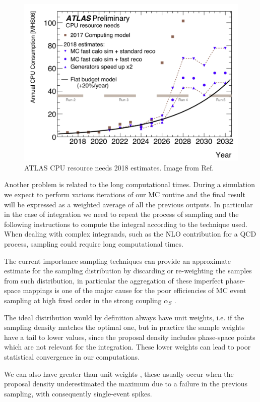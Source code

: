 \documentclass[../main/main.tex]{subfiles}
\begin{document}
\begin{figure}[h]
	\centering
	\includegraphics[width = 12cm]{../images/CPU-cost.png}
	\caption{ATLAS CPU resource needs 2018 estimates. Image from Ref\cite{ATL-SOFT-PUB-2021-001}.}
	\label{CPU cost}
\end{figure}

Another problem is related to the long computational times.
During a simulation we expect to perform various iterations of our MC routine and the final result 
will be expressed as a weighted average of all the previous outputs.
In particular in the case of integration we need to repeat the process of sampling and the following instructions to compute the integral according to the technique used. When dealing with complex integrands, such as the NLO contribution for a QCD process, sampling could require long computational times.

The current importance sampling techniques can provide an approximate estimate for the sampling distribution by discarding or re-weighting
the samples from such distribution, in particular the aggregation of these imperfect phase-space mappings is one of the major cause for
the poor efficiencies of MC event sampling at high fixed order in the strong coupling $\alpha_S$ .

The ideal distribution would by definition always have unit weights, i.e. if the sampling density matches the optimal one, but in practice 
the sample weights have a tail to lower values, since the proposal density includes phase-space points which are not relevant for the integration.
These lower weights can lead to poor statistical convergence in our computations.

 We can also have greater than unit weights , these usually occur when the proposal density underestimated the maximum due to a failure in the
previous sampling, with consequently single-event spikes.
\end{document}
